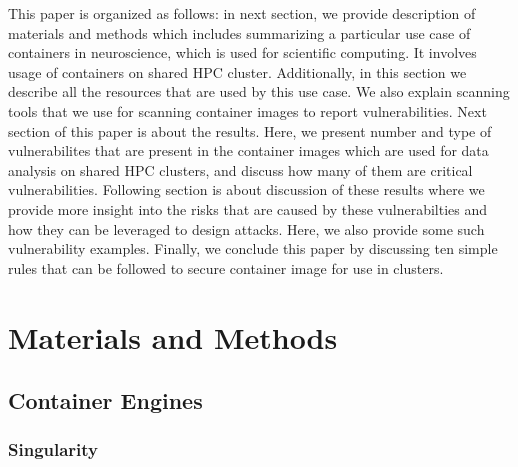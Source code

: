 \documentclass[a4paper,num-refs]{oup-contemporary}
\begin{document}
This paper is organized as follows: in next section, we provide description
of materials and methods which includes summarizing a particular use case of
containers in neuroscience, which is used for scientific computing. It involves
usage of containers on shared HPC cluster. Additionally, in this section we
describe all the resources that are used by this use case. We also explain
scanning tools that we use for scanning container images to report
vulnerabilities. Next section of this paper is about the results. Here, we
present number and type of vulnerabilites that are present in the container images
which are used for data analysis on shared HPC clusters, and discuss how many of them are
critical vulnerabilities. Following section is about discussion of these results
where we provide more insight into the risks that are caused by these vulnerabilties
and how they can be leveraged to design attacks. Here, we also provide some such
vulnerability examples. Finally, we conclude this paper by discussing ten simple
rules that can be followed to secure container image for use in clusters.

\section{Materials and Methods}

\subsection{Container Engines}

\subsubsection{Singularity}
\end{document}
